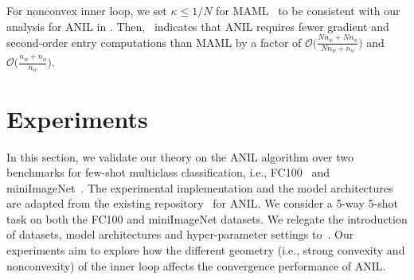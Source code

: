\documentclass{osudissert96}
\begin{document}
For nonconvex inner loop, we set $\kappa\leq 1/N$ for MAML~\cite[Corollary 2]{ji2020multi} to be consistent with our analysis for ANIL in . Then,~ indicates that 
ANIL requires fewer gradient and second-order entry computations than MAML by a factor of {\small$\mathcal{O}\big(\frac{Nn_w+Nn_\phi}{Nn_w+n_\phi}\big)$} and {\small$\mathcal{O}\big(\frac{n_w+n_\phi}{n_w}\big)$}.%


%
%

\section{Experiments}\label{exp:anilsahjb}
In this section, we validate our theory on the ANIL algorithm over two benchmarks for few-shot multiclass classification, i.e., FC100~\cite{oreshkin2018tadam} and miniImageNet~\cite{vinyals2016matching}. The experimental implementation and the model architectures are adapted from the existing repository~\cite{learn2learn2019} for ANIL. 
We consider a 5-way 5-shot task on both the FC100 and miniImageNet datasets. 
We relegate the introduction of datasets, model architectures and hyper-parameter settings to~.
Our experiments aim to explore how the different geometry (i.e., strong convexity and nonconvexity) of the inner loop affects the convergence performance of ANIL. 
\end{document}
